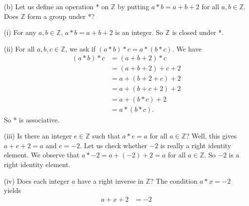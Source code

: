 \documentclass{amsbook}
\begin{document}
\begin{hEnumerateAlpha}
    \item[(b)]
        Let us define an operation * on \( \mathbb{Z} \) by putting \( a * b = a + b + 2 \) for all \( a,b \in \mathbb{Z} \). Does \( \mathbb{Z} \) form a group under *?
        \begin{hEnumerateAlpha}
            \item[(i)]
                For any \( a,b \in \mathbb{Z} \), \( a * b = a + b + 2 \) is an integer. So \( \mathbb{Z} \) is closed under *.
            \item[(ii)]
                For all \( a,b,c \in \mathbb{Z} \), we ask if \( (a * b) * c = a * (b * c) \). We have
                \begin{align*}
                    (a * b) * c &= (a + b + 2) * c \\
                    &= (a + b + 2) + c + 2 \\
                    &= a + (b + 2 + c) + 2 \\
                    &= a + (b + c + 2) + 2 \\
                    &= a + (b * c) + 2 \\
                    &= a * (b * c).
                \end{align*}
                So * is associative.
            \item[(iii)]
                Is there an integer \( e \in \mathbb{Z} \) such that \( a * e = a \) for all \( a \in \mathbb{Z} \)? Well, this gives \( a + e + 2 = a \) and \( e = -2 \). Let us check whether \( -2 \) is really a right identity element. We observe that \( a * -2 = a + (-2) + 2 = a \) for all \( a \in \mathbb{Z} \). So \( -2 \) is a right identity element.
            \item[(iv)]
                Does each integer \( a \) have a right inverse in \( \mathbb{Z} \)? The condition \( a * x = -2 \) yields
                \begin{align*}
                    a + x + 2 &= -2 
                \end{align*}
        \end{hEnumerateAlpha}
\end{hEnumerateAlpha}
\end{document}
